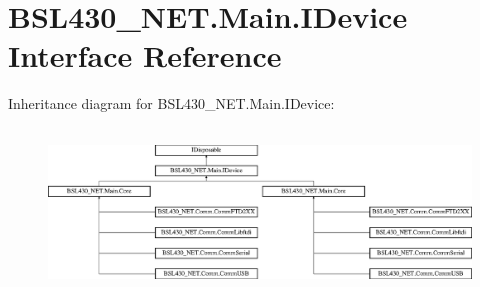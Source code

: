 \hypertarget{interface_b_s_l430___n_e_t_1_1_main_1_1_i_device}{}\section{B\+S\+L430\+\_\+\+N\+E\+T.\+Main.\+I\+Device Interface Reference}
\label{interface_b_s_l430___n_e_t_1_1_main_1_1_i_device}
Inheritance diagram for B\+S\+L430\+\_\+\+N\+E\+T.\+Main.\+I\+Device\+:\begin{figure}[H]
\begin{center}
\leavevmode
\includegraphics[height=4.454545cm]{interface_b_s_l430___n_e_t_1_1_main_1_1_i_device}
\end{center}
\end{figure}
